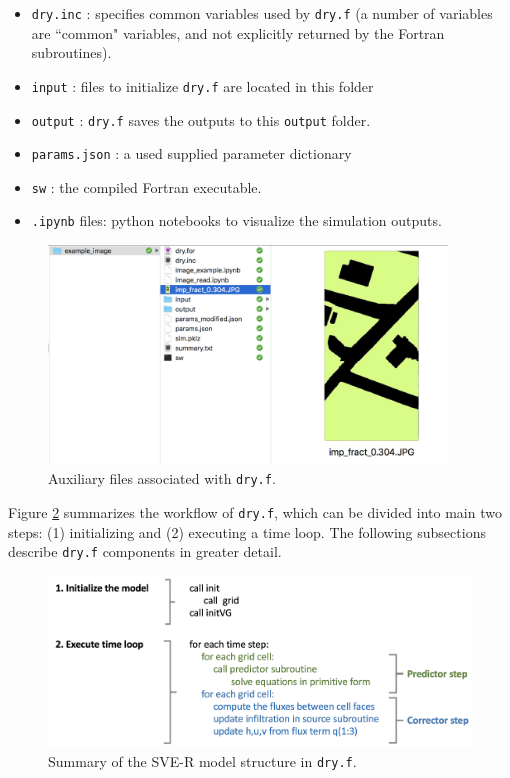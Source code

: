 \documentclass{article}
\newcommand{\code}[1]{\texttt{#1}}
\begin{document}
\begin{itemize}
	\item \code{\code{dry.inc}} : specifies common variables used by \code{dry.f}  (a number of variables are ``common" variables, and not explicitly returned by the Fortran subroutines). 
	\item \code{input} :  files to initialize \code{dry.f} are located in this folder
	\item \code{output} : \code{dry.f} saves the outputs to this \code{output} folder.	
	\item \code{params.json} : a used supplied parameter dictionary
	\item \code{sw} : the compiled Fortran executable.
	\item  \code{.ipynb} files: python notebooks to visualize the simulation outputs.
\end{itemize}
 


 \begin{figure}[h]
 \centering
\includegraphics[width=25pc]{grid/files.png}
 \caption{Auxiliary files associated with \code{dry.f}.}
 \label{files}
 \end{figure}


Figure \ref{summary} summarizes the workflow of \code{dry.f}, which can be divided into main two steps: (1) initializing and (2) executing a time loop.   The following subsections describe \code{dry.f} components in greater detail.


\begin{figure}[h]
 \centering
\includegraphics[width=30pc]{grid/summary.png}
 \caption{Summary of the SVE-R model structure in \code{dry.f}.}
 \label{summary}
 \end{figure}
\end{document}
